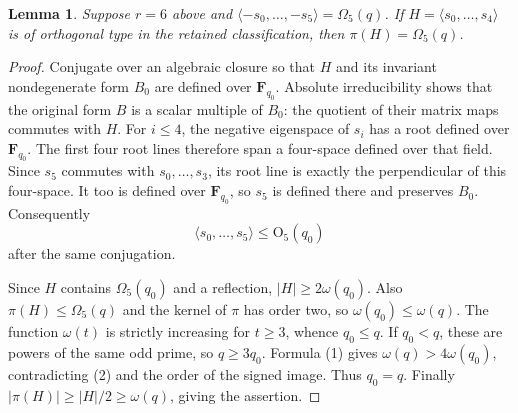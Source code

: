 \documentclass[11pt,a4paper]{article}
\newtheorem{lemma}[theorem]{Lemma}
\newcommand{\F}{\mathbf F}
\newcommand{\gen}[1]{\langle#1\rangle}
\newcommand{\Om}{\Omega}
\begin{document}
\begin{lemma}\label{descent}
Suppose $r=6$ above and $\gen{-s_0,\ldots,-s_5}=\Om_5(q)$.
If $H=\gen{s_0,\ldots,s_4}$ is of orthogonal type in the
retained classification, then $\pi(H)=\Om_5(q)$.
\end{lemma}
\begin{proof}
Conjugate over an algebraic closure so that $H$ and its invariant
nondegenerate form $B_0$ are defined over $\F_{q_0}$. Absolute
irreducibility shows that the original form $B$ is a scalar multiple
of $B_0$: the quotient of their matrix maps commutes with $H$.
For $i\le4$, the negative eigenspace of $s_i$ has a root defined
over $\F_{q_0}$. The first four root lines therefore span a
four-space defined over that field. Since $s_5$ commutes with
$s_0,\ldots,s_3$, its root line is exactly the perpendicular of
this four-space. It too is defined over $\F_{q_0}$, so $s_5$ is
defined there and preserves $B_0$. Consequently
\[
                 \gen{s_0,\ldots,s_5}\le\mathrm O_5(q_0)
                                                        \tag{2}
\]
after the same conjugation.

Since $H$ contains $\Om_5(q_0)$ and a reflection,
$|H|\ge2\omega(q_0)$. Also $\pi(H)\le\Om_5(q)$ and the
kernel of $\pi$ has order two, so $\omega(q_0)\le\omega(q)$.
The function $\omega(t)$ is strictly increasing for $t\ge3$,
whence $q_0\le q$. If $q_0<q$, these are powers of the same odd
prime, so $q\ge3q_0$. Formula (1) gives
$\omega(q)>4\omega(q_0)$, contradicting (2) and the order of
the signed image. Thus $q_0=q$. Finally
$|\pi(H)|\ge|H|/2\ge\omega(q)$, giving the assertion.
\end{proof}
\end{document}
